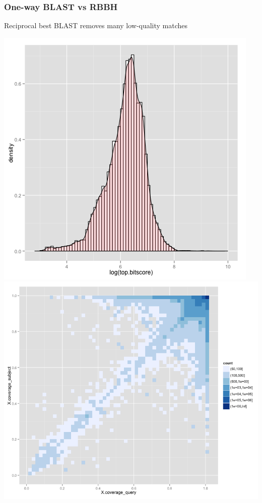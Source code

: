 \begin{frame}
  \frametitle{One-way BLAST vs RBBH}   
  \begin{block}{Reciprocal best BLAST removes many low-quality matches}
    \begin{center}
      \includegraphics[height=0.33\textheight]{images/rbbh4}
      \includegraphics[height=0.33\textheight]{images/rbbh5}

\end{center}
\end{block}
\end{frame}
